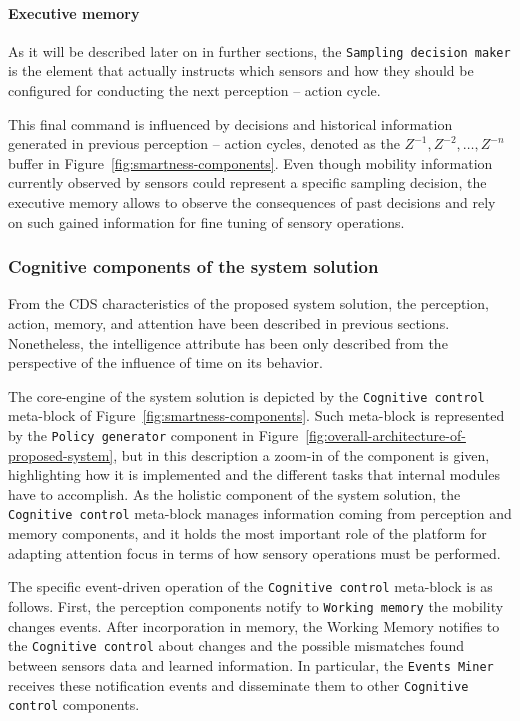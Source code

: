 \documentclass[ENG,PhD]{cinvestav}
\begin{document}
\paragraph*{Executive memory}
As it will be described later on in further sections, the \texttt{Sampling decision maker} is the element that actually instructs which sensors and how they should be configured for conducting the next perception -- action cycle.

This final command is influenced by decisions and historical information generated in previous perception -- action cycles, denoted as the $Z^{-1},Z^{-2},\ldots,Z^{-n}$ buffer in Figure~\ref{fig:smartness-components}.
Even though mobility information currently observed by sensors could represent a specific sampling decision, the executive memory allows to observe the consequences of past decisions and rely on such gained information for fine tuning of sensory operations.


\subsubsection{Cognitive components of the system solution}
From the CDS characteristics of the proposed system solution, the perception, action, memory, and attention have been described in previous sections.
Nonetheless, the intelligence attribute has been only described from the perspective of the influence of time on its behavior.

The core-engine of the system solution is depicted by the \texttt{Cognitive control} meta-block of Figure~\ref{fig:smartness-components}.
Such meta-block is represented by the \texttt{Policy generator} component in Figure~\ref{fig:overall-architecture-of-proposed-system}, but in this description a zoom-in of the component is given, highlighting how it is implemented and the different tasks that internal modules have to accomplish.
As the holistic component of the system solution, the \texttt{Cognitive control} meta-block manages information coming from perception and memory components, and it holds the most important role of the platform for adapting attention focus in terms of how sensory operations must be performed.

The specific event-driven operation of the \texttt{Cognitive control} meta-block is as follows.
First, the perception components notify to \texttt{Working memory} the mobility changes events.
After incorporation in memory, the Working Memory notifies to the \texttt{Cognitive control} about changes and the possible mismatches found between sensors data and learned information.
In particular, the \texttt{Events Miner} receives these notification events and disseminate them to other \texttt{Cognitive control} components.
\end{document}
